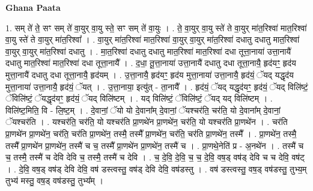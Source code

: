 \documentclass[17pt]{extarticle}
\begin{document}
\textbf{Ghana Paata } \newline

1. सम् ते॑ ते॒ सꣳ सम् ते॑ वा॒युर् वा॒यु स्ते॒ सꣳ सम् ते॑ वा॒युः । . ते॒ वा॒युर् वा॒यु स्ते॑ ते वा॒युर् मा॑त॒रिश्वा॑ मात॒रिश्वा॑ वा॒यु स्ते॑ ते वा॒युर् मा॑त॒रिश्वा᳚ । . वा॒युर् मा॑त॒रिश्वा॑ मात॒रिश्वा॑ वा॒युर् वा॒युर् मा॑त॒रिश्वा॑ दधातु दधातु मात॒रिश्वा॑ वा॒युर् वा॒युर् मा॑त॒रिश्वा॑ दधातु । . मा॒त॒रिश्वा॑ दधातु दधातु मात॒रिश्वा॑ मात॒रिश्वा॑ दधा तूत्ता॒नाया॑ उत्ता॒नायै॑ दधातु मात॒रिश्वा॑ मात॒रिश्वा॑ दधा तूत्ता॒नायै᳚ । . द॒धा॒ तू॒त्ता॒नाया॑ उत्ता॒नायै॑ दधातु दधा तूत्ता॒नायै॒ हृद॑यꣳ॒॒ हृद॑य मुत्ता॒नायै॑ दधातु दधा तूत्ता॒नायै॒ हृद॑यम् । . उ॒त्ता॒नायै॒ हृद॑यꣳ॒॒ हृद॑य मुत्ता॒नाया॑ उत्ता॒नायै॒ हृद॑यं॒ ॅयद् यद्धृद॑य मुत्ता॒नाया॑ उत्ता॒नायै॒ हृद॑यं॒ ॅयत् । . उ॒त्ता॒नाया॒ इत्यु॑त् - ता॒नायै᳚ । . हृद॑यं॒ ॅयद् यद्धृद॑यꣳ॒॒ हृद॑यं॒ ॅयद् विलि॑ष्टं॒ ॅविलि॑ष्टं॒ ॅयद्धृद॑यꣳ॒॒ हृद॑यं॒ ॅयद् विलि॑ष्टम् । . यद् विलि॑ष्टं॒ ॅविलि॑ष्टं॒ ॅयद् यद् विलि॑ष्टम् । . विलि॑ष्ट॒मिति॒ वि - लि॒ष्ट॒म् । . दे॒वानां॒ ॅयो यो दे॒वाना᳚म् दे॒वानां॒ ॅयश्चर॑ति॒ चर॑ति॒ यो दे॒वाना᳚म् दे॒वानां॒ ॅयश्चर॑ति । . यश्चर॑ति॒ चर॑ति॒ यो यश्चर॑ति प्रा॒णथे॑न प्रा॒णथे॑न॒ चर॑ति॒ यो यश्चर॑ति प्रा॒णथे॑न । . चर॑ति प्रा॒णथे॑न प्रा॒णथे॑न॒ चर॑ति॒ चर॑ति प्रा॒णथे॑न॒ तस्मै॒ तस्मै᳚ प्रा॒णथे॑न॒ चर॑ति॒ चर॑ति प्रा॒णथे॑न॒ तस्मै᳚ । . प्रा॒णथे॑न॒ तस्मै॒ तस्मै᳚ प्रा॒णथे॑न प्रा॒णथे॑न॒ तस्मै॑ च च॒ तस्मै᳚ प्रा॒णथे॑न प्रा॒णथे॑न॒ तस्मै॑ च । . प्रा॒णथे॒नेति॑ प्र - अ॒नथे॑न । . तस्मै॑ च च॒ तस्मै॒ तस्मै॑ च देवि देवि च॒ तस्मै॒ तस्मै॑ च देवि । . च॒ दे॒वि॒ दे॒वि॒ च॒ च॒ दे॒वि॒ वष॒ड् वष॑ड् देवि च च देवि॒ वष॑ट् । . दे॒वि॒ वष॒ड् वष॑ड् देवि देवि॒ वष॑ डस्त्वस्तु॒ वष॑ड् देवि देवि॒ वष॑डस्तु । . वष॑ डस्त्वस्तु॒ वष॒ड् वष॑डस्तु॒ तुभ्य॒म् तुभ्य॑ मस्तु॒ वष॒ड् वष॑डस्तु॒ तुभ्य᳚म् । \newline
\end{document}
